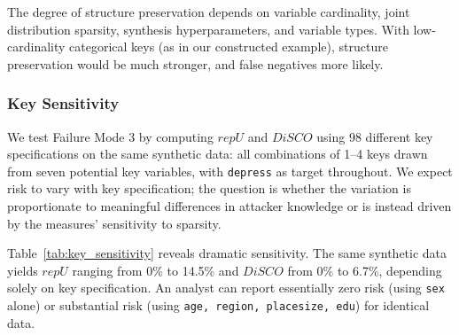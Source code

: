 \documentclass[Afour,sageh,times,doublespace]{sagej}
\begin{document}
The degree of structure preservation depends on variable cardinality, joint distribution sparsity, synthesis hyperparameters, and variable types. With low-cardinality categorical keys (as in our constructed example), structure preservation would be much stronger, and false negatives more likely.

\subsubsection{Key Sensitivity}
\label{sec:key_sensitivity}

We test Failure Mode 3 by computing $repU$ and $DiSCO$ using 98 different key specifications on the same synthetic data: all combinations of 1--4 keys drawn from seven potential key variables, with \texttt{depress} as target throughout. We expect risk to vary with key specification; the question is whether the variation is proportionate to meaningful differences in attacker knowledge or is instead driven by the measures' sensitivity to sparsity.

\begin{table}[h]
\footnotesize\sf\centering
\caption{Sensitivity of disclosure risk measures to key specification. The same synthetic data yields dramatically different risk estimates depending on which variables are designated as keys.\label{tab:key_sensitivity}}
\end{table}

Table~\ref{tab:key_sensitivity} reveals dramatic sensitivity. The same synthetic data yields $repU$ ranging from 0\% to 14.5\% and $DiSCO$ from 0\% to 6.7\%, depending solely on key specification. An analyst can report essentially zero risk (using \texttt{sex} alone) or substantial risk (using \texttt{age, region, placesize, edu}) for identical data.
\end{document}
